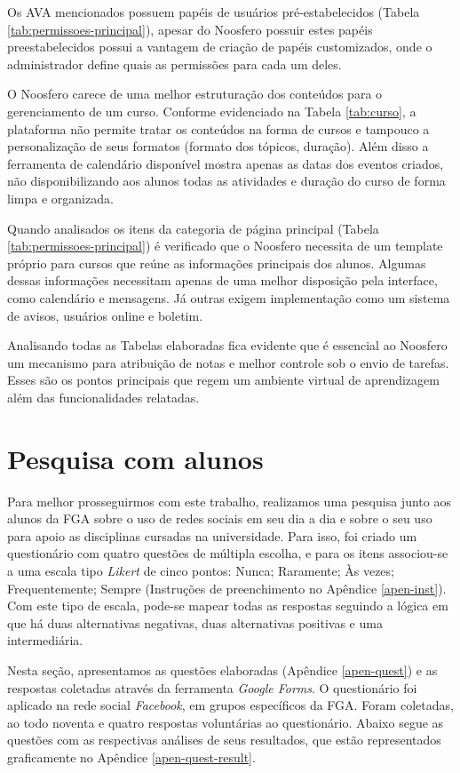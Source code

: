 Os AVA mencionados possuem papéis de usuários pré-estabelecidos (Tabela \ref{tab:permissoes-principal}), apesar do Noosfero possuir estes papéis preestabelecidos possui a vantagem de criação de papéis customizados, onde o administrador define quais as permissões para cada um deles.

O Noosfero carece de uma melhor estruturação dos conteúdos para o gerenciamento de um curso. Conforme evidenciado na Tabela \ref{tab:curso}, a plataforma não permite tratar os conteúdos na forma de cursos e tampouco a personalização de seus formatos (formato dos tópicos, duração). Além disso a ferramenta de calendário disponível mostra apenas as datas dos eventos criados, não disponibilizando aos alunos todas as atividades e duração do curso de forma limpa e organizada.

Quando analisados os itens da categoria de página principal (Tabela \ref{tab:permissoes-principal}) é verificado que o Noosfero necessita de um template próprio para cursos que reúne as informações principais dos alunos. Algumas dessas informações necessitam apenas de uma melhor disposição pela interface, como calendário e mensagens. Já outras exigem implementação como um sistema de avisos, usuários online e boletim.

Analisando todas as Tabelas elaboradas fica evidente que é essencial ao Noosfero um mecanismo para atribuição de notas e melhor controle sob o envio de tarefas. Esses são os pontos principais que regem um ambiente virtual de aprendizagem além das funcionalidades relatadas.

\section{Pesquisa com alunos}
\label{pesquisa-alunos}

Para melhor prosseguirmos com este trabalho, realizamos uma pesquisa junto aos alunos da FGA sobre o uso de redes sociais em seu dia a dia e sobre o seu uso para apoio as disciplinas cursadas na universidade. Para isso, foi criado um questionário com quatro questões de múltipla escolha, e para os itens associou-se a uma escala tipo \emph{Likert} de cinco pontos: Nunca; Raramente; Às vezes; Frequentemente; Sempre (Instruções de preenchimento no Apêndice \ref{apen-inst}). Com este tipo de escala, pode-se mapear todas as respostas seguindo a lógica em que há duas alternativas negativas, duas alternativas positivas e uma intermediária.

Nesta seção, apresentamos as questões elaboradas (Apêndice \ref{apen-quest}) e as respostas coletadas através da ferramenta \textit{Google Forms}. O questionário foi aplicado na rede social \textit{Facebook}, em grupos específicos da FGA. Foram coletadas, ao todo noventa e quatro respostas voluntárias ao questionário. Abaixo segue as questões com as respectivas análises de seus resultados, que estão representados graficamente no Apêndice \ref{apen-quest-result}.

